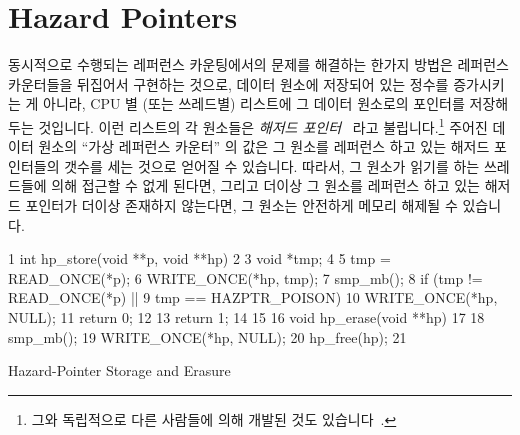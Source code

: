 
\section{Hazard Pointers}
\label{sec:defer:Hazard Pointers}

동시적으로 수행되는 레퍼런스 카운팅에서의 문제를 해결하는 한가지 방법은
레퍼런스 카운터들을 뒤집어서 구현하는 것으로,
데이터 원소에 저장되어 있는 정수를 증가시키는 게 아니라, CPU 별 (또는 쓰레드별)
리스트에 그 데이터 원소로의 포인터를 저장해 두는 것입니다.
이런 리스트의 각 원소들은 \emph{해저드 포인터}~\cite{MagedMichael04a} 라고
불립니다.\footnote{
	그와 독립적으로 다른 사람들에 의해 개발된 것도
	있습니다~\cite{HerlihyLM02}.}
주어진 데이터 원소의 ``가상 레퍼런스 카운터'' 의 값은 그 원소를 레퍼런스 하고
있는 해저드 포인터들의 갯수를 세는 것으로 얻어질 수 있습니다.
따라서, 그 원소가 읽기를 하는 쓰레드들에 의해 접근할 수 없게 된다면, 그리고
더이상 그 원소를 레퍼런스 하고 있는 해저드 포인터가 더이상 존재하지 않는다면,
그 원소는 안전하게 메모리 해제될 수 있습니다.

\begin{listing}[btp]
{ \scriptsize
\begin{verbbox}
 1 int hp_store(void **p, void **hp)
 2 {
 3   void *tmp;
 4 
 5   tmp = READ_ONCE(*p);
 6   WRITE_ONCE(*hp, tmp);
 7   smp_mb();
 8   if (tmp != READ_ONCE(*p) ||
 9       tmp == HAZPTR_POISON) {
10     WRITE_ONCE(*hp, NULL);
11     return 0;
12   }
13   return 1;
14 }
15 
16 void hp_erase(void **hp)
17 {
18   smp_mb();
19   WRITE_ONCE(*hp, NULL);
20   hp_free(hp);
21 }
\end{verbbox}
}
\centering
\theverbbox
\caption{Hazard-Pointer Storage and Erasure}
\label{lst:defer:Hazard-Pointer Storage and Erasure}
\end{listing}

